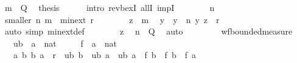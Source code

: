 \begin{isabellebody}
\ {\isacartoucheopen}m\ {\isasymin}\ Q{\isacartoucheclose}\ \isamarkupfalse%
\ {\isacharquery}{\kern0pt}thesis\isanewline
\ \ \ \ \isamarkupfalse%
\ {\isacharparenleft}{\kern0pt}intro\ rev{\isacharunderscore}{\kern0pt}bexI\ allI\ impI{\isacharparenright}{\kern0pt}\isanewline
\ \ \ \ \ \ \isamarkupfalse%
\ n\isanewline
\ \ \ \ \ \ \isamarkupfalse%
\ smaller{\isacharcolon}{\kern0pt}\ {\isachardoublequoteopen}{\isacharparenleft}{\kern0pt}n{\isacharcomma}{\kern0pt}\ m{\isacharparenright}{\kern0pt}\ {\isasymin}\ min{\isacharunderscore}{\kern0pt}ext\ r{\isachardoublequoteclose}\isanewline
\ \ \ \ \ \ \isamarkupfalse%
\ {\isacartoucheopen}z\ {\isasymin}\ m{\isacartoucheclose}\ \isamarkupfalse%
\ y\ \ {\isachardoublequoteopen}y\ {\isasymin}\ n{\isachardoublequoteclose}\ {\isachardoublequoteopen}{\isacharparenleft}{\kern0pt}y{\isacharcomma}{\kern0pt}\ z{\isacharparenright}{\kern0pt}\ {\isasymin}\ r{\isachardoublequoteclose}\isanewline
\ \ \ \ \ \ \ \ \isamarkupfalse%
\ {\isacharparenleft}{\kern0pt}auto\ simp{\isacharcolon}{\kern0pt}\ min{\isacharunderscore}{\kern0pt}ext{\isacharunderscore}{\kern0pt}def{\isacharparenright}{\kern0pt}\isanewline
\ \ \ \ \ \ \isamarkupfalse%
\ z{\isacharparenleft}{\kern0pt}{}{\isacharparenright}{\kern0pt}\ \isamarkupfalse%
\ {\isachardoublequoteopen}n\ {\isasymnotin}\ Q{\isachardoublequoteclose}\ \isamarkupfalse%
\ auto\isanewline
\ \ \ \ \isamarkupfalse%
\isanewline
\ \ \isamarkupfalse%
\isanewline
{}\isamarkupfalse%
%
\endisatagproof
{\isafoldproof}%
%
\isadelimproof
%
\endisadelimproof
%
\isadelimdocument
%
\endisadelimdocument
%
\isatagdocument
%
\isamarkuptrue%
%
\endisatagdocument
{\isafolddocument}%
%
\isadelimdocument
%
\endisadelimdocument
{}\isamarkupfalse%
\ wf{\isacharunderscore}{\kern0pt}bounded{\isacharunderscore}{\kern0pt}measure{\isacharcolon}{\kern0pt}\isanewline
\ \ \ ub\ {\isacharcolon}{\kern0pt}{\isacharcolon}{\kern0pt}\ {\isachardoublequoteopen}{\isacharprime}{\kern0pt}a\ {\isasymRightarrow}\ nat{\isachardoublequoteclose}\isanewline
\ \ \ \ \ f\ {\isacharcolon}{\kern0pt}{\isacharcolon}{\kern0pt}\ {\isachardoublequoteopen}{\isacharprime}{\kern0pt}a\ {\isasymRightarrow}\ nat{\isachardoublequoteclose}\isanewline
\ \ \ {\isachardoublequoteopen}{\isasymAnd}a\ b{\isachardot}{\kern0pt}\ {\isacharparenleft}{\kern0pt}b{\isacharcomma}{\kern0pt}\ a{\isacharparenright}{\kern0pt}\ {\isasymin}\ r\ {\isasymLongrightarrow}\ ub\ b\ {\isasymle}\ ub\ a\ {\isasymand}\ ub\ a\ {\isasymge}\ f\ b\ {\isasymand}\ f\ b\ {\isachargreater}{\kern0pt}\ f\ a{\isachardoublequoteclose}\isanewline

\end{isabellebody}

